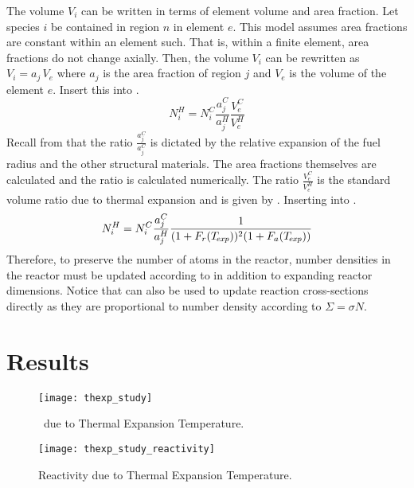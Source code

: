     The volume $V_i$ can be written in terms of element volume and area
    fraction. Let species $i$ be contained in region $n$ in element $e$. This
    model assumes area fractions are constant within an element such. That is,
    within a finite element, area fractions do not change axially. Then, the
    volume $V_i$ can be rewritten as $V_i = a_j \, V_e$ where $a_j$ is the area
    fraction of region $j$ and $V_e$ is the volume of the element $e$. Insert
    this into .
    \begin{equation}
      \label{eq:nden_expansion_expanded}
      N_i^H = N_i^C \frac{a_j^C}{a_j^H} \frac{V_e^C}{V_e^H}
    \end{equation}
    Recall from  that the
    ratio $\frac{a_j^C}{a_j^C}$ is dictated by the relative expansion of the
    fuel radius and the other structural materials. The area fractions
    themselves are calculated and the ratio is calculated numerically. The ratio
    $\frac{V_e^C}{V_e^H}$ is the standard volume ratio due to thermal expansion
    and is given by . Inserting 
    into .
    \begin{equation}
      \label{eq:nden_thexp_update}
      N_i^H = N_i^C \frac{a_j^C}{a_j^H} 
        \frac{1}{(1+F_r(T_{\!\mbox{\scriptsize \em exp}}))^2 (1+F_a(T_{\!\mbox{\scriptsize \em exp}}))}
    \end{equation}
    Therefore, to preserve the number of atoms in the reactor, number densities
    in the reactor must be updated according to  in
    addition to expanding reactor dimensions. Notice that
     can also be used to update reaction 
    cross-sections directly as they are proportional to number density according
    to $\Sigma = \sigma N$.

\section{Results}
  \begin{figure}
    \centering
    \texttt{[image: thexp\_study]}
    \caption{\keff \, due to Thermal Expansion Temperature.}
    \label{fig:thexp_study}
  \end{figure}

  \begin{figure}
    \centering
    \texttt{[image: thexp\_study\_reactivity]}
    \caption{Reactivity due to Thermal Expansion Temperature.}
    \label{fig:thexp_study_reactivity}
  \end{figure}


